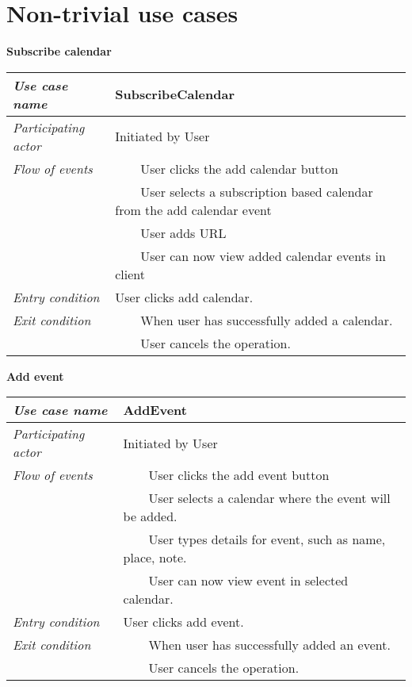 \documentclass[10pt]{report}
\newcommand{\tabitem}{~~\llap{\textbullet}~~}
\numberwithin{equation}{section} %
\numberwithin{figure}{section} %
\numberwithin{table}{section} %
\begin{document}
\section{Non-trivial use cases}
\begin{table}[H]
\noindent \textbf{Subscribe calendar}\\
\begin{tabularx}{\textwidth}{l X}
\midrule
\textit{Use case name} & SubscribeCalendar \\ \midrule
\textit{Participating actor} & Initiated by User \\ \midrule
\textit{Flow of events} & \tabitem User clicks the add calendar button\\
                                       & \tabitem User selects a subscription
                                       based calendar from the add calendar
                                       event\\
                                       & \tabitem User adds URL\\
                                       & \tabitem User can now view added calendar events
                                       in client\\
                        \midrule
\textit{Entry condition} & User clicks add calendar.\\ \midrule
\textit{Exit condition} & \tabitem When user has successfully added a calendar. \\
						& \tabitem User cancels the operation.\\
                        \midrule
\end{tabularx}
\end{table}

\begin{table}[H]
\noindent \textbf{Add event}\\
\begin{tabularx}{\textwidth}{l X}
\midrule
\textit{Use case name} & AddEvent \\ \midrule
\textit{Participating actor} & Initiated by User \\ \midrule
\textit{Flow of events} & \tabitem User clicks the add event button\\
                                       & \tabitem User selects a calendar where
                                       the event will be added.\\
                                       & \tabitem User types details for event, such as
                                       name, place, note.\\
                                       & \tabitem User can now view event in selected calendar.\\
                        \midrule
\textit{Entry condition} & User clicks add event.\\ \midrule
\textit{Exit condition} & \tabitem When user has successfully added  an event. \\
						& \tabitem User cancels the operation.\\
                        \midrule
\end{tabularx}
\end{table}
\end{document}
